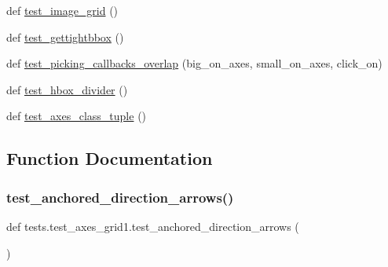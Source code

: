 \begin{DoxyCompactItemize}
\item 
def \hyperlink{namespacetests_1_1test__axes__grid1_ac0a5f42cc657ac306bf15ce8e7e5a647}{test\+\_\+image\+\_\+grid} ()
\item 
def \hyperlink{namespacetests_1_1test__axes__grid1_aa5ad06c53b6b9190aea178a1d6982a62}{test\+\_\+gettightbbox} ()
\item 
def \hyperlink{namespacetests_1_1test__axes__grid1_a6baf7a551a9d4deb098837c76a0c82da}{test\+\_\+picking\+\_\+callbacks\+\_\+overlap} (big\+\_\+on\+\_\+axes, small\+\_\+on\+\_\+axes, click\+\_\+on)
\item 
def \hyperlink{namespacetests_1_1test__axes__grid1_a6576a7d7e3bb77b4c82bd7bb8117e066}{test\+\_\+hbox\+\_\+divider} ()
\item 
def \hyperlink{namespacetests_1_1test__axes__grid1_aadc5bef9aab3dfdc4eae8b0c1436be54}{test\+\_\+axes\+\_\+class\+\_\+tuple} ()
\end{DoxyCompactItemize}


\subsection{Function Documentation}
\mbox{\label{namespacetests_1_1test__axes__grid1_aef358e2620eb54c402d98f0a5df6b7a6}} 
\subsubsection{\texorpdfstring{test\+\_\+anchored\+\_\+direction\+\_\+arrows()}{test\_anchored\_direction\_arrows()}}
{\footnotesize\ttfamily def tests.\+test\+\_\+axes\+\_\+grid1.\+test\+\_\+anchored\+\_\+direction\+\_\+arrows (\begin{DoxyParamCaption}{ }\end{DoxyParamCaption})}

\mbox{\label{namespacetests_1_1test__axes__grid1_a9f6717034fcce8f54b6a0a9bad05af68}} 
